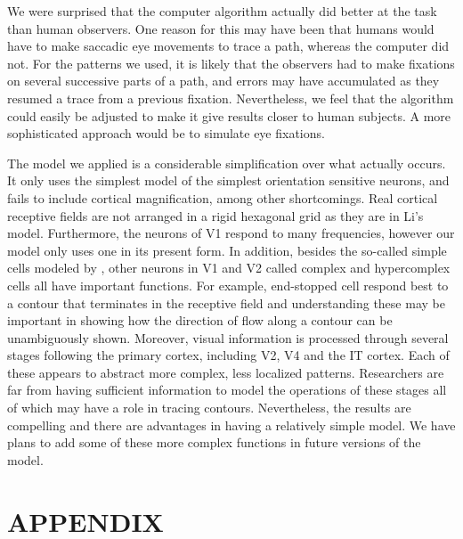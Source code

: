 \documentclass[prodmode,hillsideplop]{../acmlarge}
\begin{document}
We were surprised that the computer algorithm actually did better at
the task than human observers. One reason for this may have been that
humans would have to make saccadic eye movements to trace a path,
whereas the computer did not. For the patterns we used, it is likely
that the observers had to make fixations on several successive parts
of a path, and errors may have accumulated as they resumed a trace
from a previous fixation. Nevertheless, we feel that the algorithm
could easily be adjusted to make it give results closer to human
subjects. A more sophisticated approach would be to simulate eye fixations.

The model we applied is a considerable simplification over what
actually occurs. It only uses the simplest model of the simplest
orientation sensitive neurons, and fails to include cortical
magnification, among other shortcomings. Real cortical receptive
fields are not arranged in a rigid hexagonal grid as they are in Li's
model. Furthermore, the neurons of V1 respond to many frequencies,
however our model only uses one in its present form. In addition,
besides the so-called simple cells modeled by , other
neurons in V1 and V2 called complex and hypercomplex cells all have
important functions. For example, end-stopped cell respond best to a
contour that terminates in the receptive field and understanding
these may be important in showing how the direction of flow along a
contour can be unambiguously shown. Moreover, visual information is
processed through several stages following the primary cortex,
including V2, V4 and the IT cortex. Each of these appears to abstract
more complex, less localized patterns. Researchers are far from
having sufficient information to model the operations of these stages
all of which may have a role in tracing contours. Nevertheless, the
results are compelling and there are advantages in having a
relatively simple model. We have plans to add some of these more
complex functions in future versions of the model.



\appendix
\section*{APPENDIX}
\setcounter{section}{1}
\end{document}
